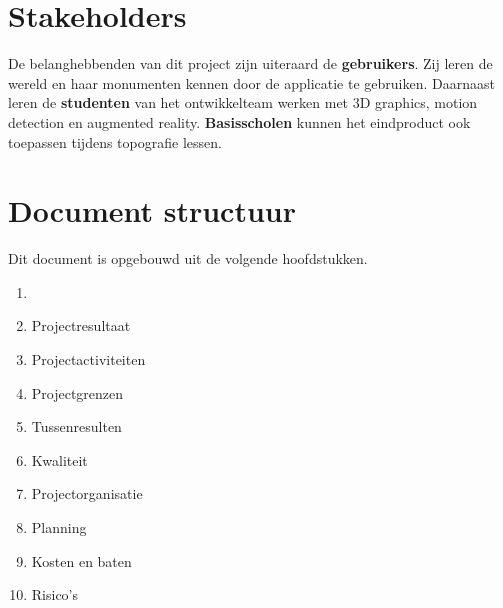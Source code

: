 \section{Stakeholders} \label{sec:stakeholders}
De belanghebbenden van dit project zijn uiteraard de \textbf{gebruikers}. Zij leren de wereld en haar monumenten kennen door de applicatie te gebruiken. Daarnaast leren de \textbf{studenten} van het ontwikkelteam werken met 3D graphics, motion detection en augmented reality. \textbf{Basisscholen} kunnen het eindproduct ook toepassen tijdens topografie lessen.

\section{Document structuur} \label{sec:structure}
Dit document is opgebouwd uit de volgende hoofdstukken.
\begin{enumerate}
	\item {}
	\item Projectresultaat
	\item Projectactiviteiten
	\item Projectgrenzen
	\item Tussenresulten
	\item Kwaliteit
	\item Projectorganisatie
	\item Planning
	\item Kosten en baten
	\item Risico's
\end{enumerate}